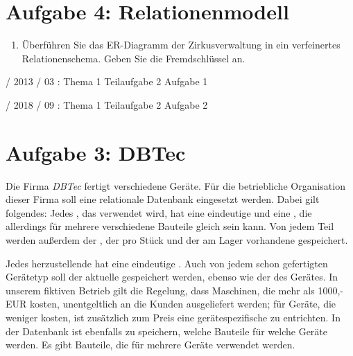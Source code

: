 \documentclass{lehramt-informatik-haupt}
\begin{document}

\section{Aufgabe 4: Relationenmodell}

\begin{enumerate}


\item Überführen Sie das ER-Diagramm der Zirkusverwaltung in
ein verfeinertes Relationenschema. Geben Sie die Fremdschlüssel an.

\end{enumerate}

%

 / 2013 / 03 : Thema 1 Teilaufgabe 2 Aufgabe 1

 / 2018 / 09 : Thema 1 Teilaufgabe 2 Aufgabe 2


\section{Aufgabe 3: DBTec}

Die Firma \emph{DBTec} fertigt verschiedene Geräte. Für die betriebliche
Organisation dieser Firma soll eine relationale Datenbank eingesetzt
werden. Dabei gilt folgendes:
Jedes , das verwendet wird, hat eine eindeutige
 und eine , die allerdings
für mehrere verschiedene Bauteile gleich sein kann. Von jedem Teil
werden außerdem der , der
 pro Stück und der am Lager vorhandene
 gespeichert.

Jedes herzustellende  hat eine eindeutige
. Auch von jedem schon gefertigten Gerätetyp
soll der aktuelle  gespeichert werden, ebenso
wie der  des Gerätes. In unserem fiktiven
Betrieb gilt die Regelung, dass Maschinen, die mehr als 1000,- EUR
kosten, unentgeltlich an die Kunden ausgeliefert werden; für Geräte, die
weniger kosten, ist zusätzlich zum Preis eine gerätespezifische
 zu entrichten. In der Datenbank ist
ebenfalls zu speichern, welche Bauteile für welche Geräte
 werden. Es gibt Bauteile, die für mehrere
Geräte verwendet werden.
\end{document}
